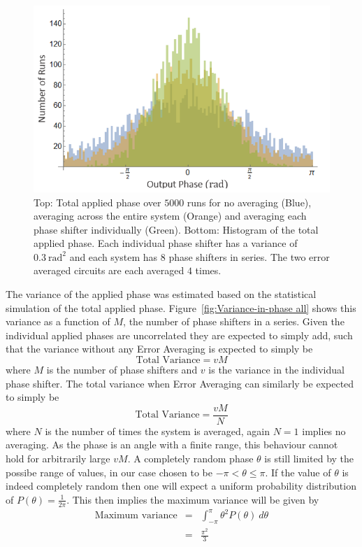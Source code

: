 \documentclass[aps,pra,twocolumn,superscriptaddress,numerical,floatfix]{revtex4-1}
\begin{document}
\begin{figure}
\centerline{\includegraphics[width=\columnwidth]{totPhase2.png}}
\caption{Top: Total applied phase over $5000$ runs for no averaging (Blue), averaging across the entire system (Orange) and averaging each phase shifter individually (Green). Bottom: Histogram of the total applied phase. Each individual phase shifter has a variance of $0.3\ \textrm{rad}^{2}$ and each system has $8$ phase shifters in series. The two error averaged circuits are each averaged $4$ times. \label{fig:Total-applied-phase2}}
\end{figure}

The variance of the applied phase was estimated based on the statistical simulation of the total applied phase. Figure~\ref{fig:Variance-in-phase all} shows this variance as a function of $M$, the number of phase shifters in a series. Given the individual applied phases are uncorrelated they are expected to simply add, such that the variance without any Error Averaging is expected to simply be
\begin{equation}
\textrm{Total Variance}=vM\label{eq:Tot Var no correction}
\end{equation}
where $M$ is the number of phase shifters and $v$ is the variance in the individual phase shifter. The total variance when Error Averaging can similarly be expected to simply be
\begin{equation}
\textrm{Total Variance}=\frac{vM}{N}\label{eq:Tot Var w/ correction}
\end{equation}
where $N$ is the number of times the system is averaged, again $N=1$ implies no averaging. As the phase is an angle with a finite range, this behaviour cannot hold for arbitrarily large $vM$. A completely random phase $\theta$ is still limited by the possibe range of values, in our case chosen to be $-\pi<\theta\le\pi$. If the value of $\theta$ is indeed completely random then one will expect a uniform probability distribution of $P\left(\theta\right)=\frac{1}{2\pi}$. This then implies the maximum variance will be given by
\begin{eqnarray}
\textrm{Maximum variance} & = & \int_{-\pi}^{\pi}\theta^{2}P\left(\theta\right)\ d\theta\nonumber \\
& = & \frac{\pi^{2}}{3}\label{eq:Max Var}
\end{eqnarray}
\end{document}
